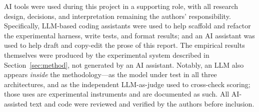 \documentclass[sigconf,nonacm]{acmart}
\begin{document}
AI tools were used during this project in a supporting role, with all research
design, decisions, and interpretation remaining the authors' responsibility.
Specifically, LLM-based coding assistants were used to help scaffold and refactor
the experimental harness, write tests, and format results; and an AI assistant
was used to help draft and copy-edit the prose of this report. The empirical
results themselves were produced by the experimental system described in
Section~\ref{sec:method}, not generated by an AI assistant. Notably, an LLM also
appears \emph{inside} the methodology---as the model under test in all three
architectures, and as the independent LLM-as-judge used to cross-check scoring;
those uses are experimental instruments and are documented as such. All
AI-assisted text and code were reviewed and verified by the authors before
inclusion.
\end{document}
